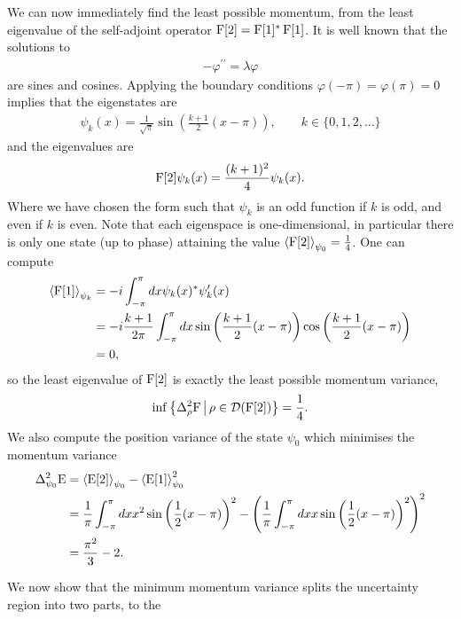 We can now immediately find the least possible momentum, from the least eigenvalue of the self-adjoint operator $\operatorname{F}[2] = \operatorname{F}[1]^*\operatorname{F}[1]$. It is well known that the solutions to
\begin{align}
  -\varphi^{\prime\prime} = \lambda\varphi
\end{align}
are sines and cosines. Applying the boundary conditions $\varphi(-\pi)=\varphi(\pi)=0$ implies that the eigenstates are
\begin{align}
  \psi_k(x) = \frac{1}{\sqrt{\pi}}\sin\left(\frac{k+1}{2}(x-\pi)\right), \qquad k\in\{0,1,2,\hdots\}
\end{align}
and the eigenvalues are
\begin{align}
  \operatorname{F}[2]\psi_k(x) = \frac{(k+1)^2}{4}\psi_k(x).
\end{align}
Where we have chosen the form such that $\psi_k$ is an odd function if $k$ is odd, and even if $k$ is even. Note that each eigenspace is one-dimensional, in particular there is only one state (up to phase) attaining the value $\left\langle{\operatorname{F}[2]}\right\rangle_{\psi_0} = \frac{1}{4}$. One can compute
\begin{align}
  \left\langle{\operatorname{F}[1]}\right\rangle_{\psi_k} &= -i\int_{-\pi}^\pi dx \psi_k(x)^* \psi_k^\prime(x)\\
                         &= -i\frac{k+1}{2\pi}\int_{-\pi}^\pi dx \sin\left(\frac{k+1}{2}(x-\pi)\right) \cos\left(\frac{k+1}{2}(x-\pi)\right)\\
                         &= 0,
\end{align}
so the least eigenvalue of $\operatorname{F}[2]$ is exactly the least possible momentum variance,
\begin{align}
  \inf\left\{\varr{\opf}\,\middle|\,\rho\in\dom{\opf[2]}\right\} = \frac{1}{4}.
\end{align}
We also compute the position variance of the state $\psi_0$ which minimises the momentum variance
\begin{align}
  \var[\psi_0]{\ope} &= \expe{\ope[2]}{\psi_0} - \expe{\ope[1]}{\psi_0}^2\\
                     &= \frac{1}{\pi}\int_{-\pi}^\pi dx x^2 \sin\left(\frac{1}{2}(x-\pi)\right)^2 - \left(\frac{1}{\pi}\int_{-\pi}^\pi dx x \sin\left(\frac{1}{2}(x-\pi)\right)^2\right)^2\\
                     &= \frac{\pi^2}{3} - 2.
\end{align}

We now show that the minimum momentum variance splits the uncertainty region into two parts, to the 

